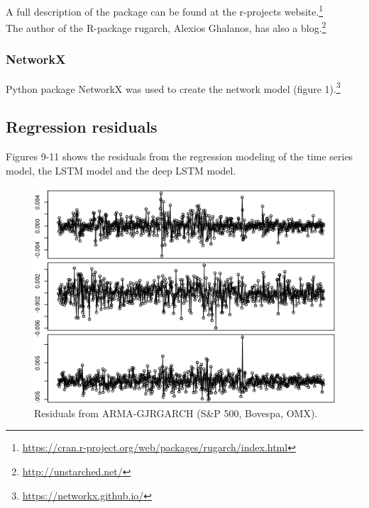 \documentclass[12pt, letterpaper]{amsart}%
\begin{document}
A full description of the package can be found at the r-projects website.\footnote{\url{https://cran.r-project.org/web/packages/rugarch/index.html}}
\\

The author of the R-package rugarch, Alexios Ghalanos, has also a blog.\footnote{\url{http://unstarched.net/}}

\subsubsection{NetworkX}
Python package NetworkX was used to create the network model (figure 1).\footnote{\url{https://networkx.github.io/}}

\subsection{Regression residuals}
Figures 9-11 shows the residuals from the regression modeling of the time series model, the LSTM model and the deep LSTM model.


\begin{figure}
\caption{Residuals from ARMA-GJRGARCH (S\&P 500, Bovespa, OMX).}
\centering
\includegraphics[scale=0.4]{garch_resid.png}
\end{figure}
\end{document}
